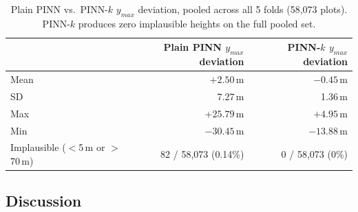\begin{table}[!htbp]
\centering
\small
\begin{tabular}{lrr}
\toprule
& Plain PINN $y_{max}$ deviation & PINN-$k$ $y_{max}$ deviation \\
\midrule
Mean & $+2.50$\,m & $-0.45$\,m \\
SD & 7.27\,m & 1.36\,m \\
Max & $+25.79$\,m & $+4.95$\,m \\
Min & $-30.45$\,m & $-13.88$\,m \\
Implausible ($<$5\,m or $>$70\,m) & 82 / 58,073 (0.14\%) & 0 / 58,073 (0\%) \\
\bottomrule
\end{tabular}
\caption{\small{Plain PINN vs.\ PINN-$k$ $y_{max}$ deviation, pooled across all 5 folds
(58,073 plots). PINN-$k$ produces zero implausible heights on the full pooled set.}}
\label{tab:plausibility-comparison}
\end{table}

\subsection{Discussion}


